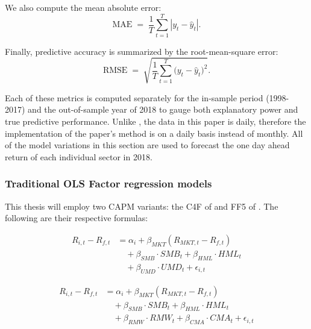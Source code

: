 We also compute the mean absolute error:
\begin{equation}
\label{eq:mae}
\mathrm{MAE} \;=\; \frac{1}{T}\sum_{t=1}^{T}|y_{t}-\hat y_{t}|.
\end{equation}

Finally, predictive accuracy is summarized by the root-mean-square error:  
\begin{equation}
\label{eq:rmse}
\mathrm{RMSE} \;=\; \sqrt{\frac{1}{T}\sum_{t=1}^{T}\bigl(y_{t}-\hat y_{t}\bigr)^2}.
\end{equation}  


Each of these metrics is computed separately for the in-sample period (1998-2017) and the out-of-sample year of 2018 to gauge both explanatory power and true predictive performance. Unlike , the data in this paper is daily, therefore the implementation of the paper's method is on a daily basis instead of monthly. All of the model variations in this section are used to forecast the one day ahead return of each individual sector in 2018. 

\subsubsection{Traditional OLS Factor regression models}
This thesis will employ two CAPM variants: the C4F of  and FF5 of . The following are their respective formulas:

\begin{equation}
    \label{eq:c4f}
    \begin{split}
        R_{i,t} - R_{f,t} &= \alpha_i + \beta_{MKT} (R_{MKT,t} - R_{f,t}) \\
        &\quad + \beta_{SMB} \cdot SMB_t + \beta_{HML} \cdot HML_t \\
        &\quad + \beta_{UMD} \cdot UMD_t + \epsilon_{i,t}
    \end{split}
\end{equation}

\begin{equation}
    \label{eq:ff5}
    \begin{split}
        R_{i,t} - R_{f,t} &= \alpha_i + \beta_{MKT} (R_{MKT,t} - R_{f,t}) \\
        &\quad + \beta_{SMB} \cdot SMB_t + \beta_{HML} \cdot HML_t \\
        &\quad + \beta_{RMW} \cdot RMW_t + \beta_{CMA} \cdot CMA_t + \epsilon_{i,t}
    \end{split}
\end{equation}

